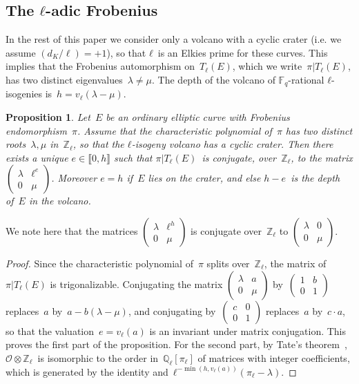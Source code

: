 \documentclass{lms}
\newtheorem{prop}[thm]{Proposition}
\newcommand{\F}{\mathbb{F}}
\begin{document}
\subsection{The $ℓ$-adic Frobenius}

In the rest of this paper we consider only a volcano with a cyclic
crater (i.e. we assume $(d_K/\ell) = +1$),
so that $ℓ$~is an Elkies prime for these curves.
This implies that the Frobenius automorphism on~$T_ℓ(E)$,
which we write~$π|T_ℓ(E)$, has two distinct eigenvalues~$λ ≠ μ$.
The depth of the volcano of $\F_q$-rational $ℓ$-isogenies
is~$h = v_ℓ(λ-μ)$.

\begin{prop}\label{prop:matrice-frobenius}
Let~$E$ be an ordinary elliptic curve with Frobenius endomorphism~$π$.
Assume that the characteristic polynomial of~$π$
has two distinct roots~$λ, μ$ in~$ℤ_ℓ$,
so that the $ℓ$-isogeny volcano has a cyclic crater.
Then there exists a unique $e ∈ \llbracket 0, h\rrbracket$
such that $π|T_ℓ(E)$~is conjugate, over~$ℤ_ℓ$,
to the matrix $\left ( \begin{smallmatrix}λ & ℓ^e \\ 0 & μ
\end{smallmatrix}\right )$.
Moreover $e = h$ if~$E$ lies on the crater,
and else $h - e$~is the depth of~$E$ in the volcano.
\end{prop}

We note here that the matrices $\left(\begin{smallmatrix} λ & ℓ^h \\ 0 &
μ \end{smallmatrix}\right)$ is conjugate over~$ℤ_ℓ$
to $\left(\begin{smallmatrix} λ & 0 \\ 0 & μ\end{smallmatrix}\right)$.
\begin{proof}
Since the characteristic polynomial of~$π$ splits over~$ℤ_ℓ$,
the matrix of~$π|T_ℓ(E)$ is trigonalizable.
Conjugating the matrix $\left ( \begin{smallmatrix}λ & a\\0 & μ
\end{smallmatrix}\right )$ by~$\left ( \begin{smallmatrix}1 & b\\0 & 1
\end{smallmatrix} \right )$ replaces~$a$ by~$a - b (λ - μ)$,
and conjugating by~$\left(\begin{smallmatrix} c & 0 \\ 0 &
1\end{smallmatrix}\right)$ replaces~$a$ by~$c · a$,
so that the valuation~$e = v_ℓ(a)$ is an invariant under matrix conjugation.
This proves the first part of the proposition.
For the second part, by Tate's theorem~\cite[Isogeny theorem 7.7 (a)]{Sil},
$\mathcal O ⊗ ℤ_ℓ$~is isomorphic to the order in~$ℚ_ℓ[π_ℓ]$
of matrices with integer coefficients,
which is generated by the identity and~$ℓ^{-\min (h, v_ℓ(a))} (π_ℓ-λ)$.
\end{proof}
\end{document}
